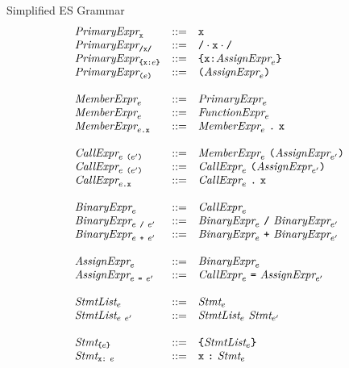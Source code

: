 \documentclass[onecolumn]{sigplanconf-onecolumn}
\begin{document}
\begin{displayfigure*}{\label{fig:grammar}Simplified ES Grammar}
\[
\begin{array}{lcl}
  \textit{PrimaryExpr}_{\texttt{x}} &::=& \texttt{x} 
  \\
  \textit{PrimaryExpr}_{\texttt{/x/}} &::=& \texttt{/} \cdot \texttt{x} \cdot \texttt{/} 
  \\
  \textit{PrimaryExpr}_{\texttt{\{}\texttt{x} \texttt{:} e\texttt{\}}} &::=& 
  \texttt{\{}\texttt{x} \texttt{:} \textit{AssignExpr}_{e}\texttt{\}}
  \\
  \textit{PrimaryExpr}_{\texttt{(}e\texttt{)}} &::=& 
  \texttt{(}\textit{AssignExpr}_{e}\texttt{)}
  \\ \\
  \textit{MemberExpr}_{e} &::=&
  \textit{PrimaryExpr}_{e}
  \\
  \textit{MemberExpr}_{e} &::=&
  \textit{FunctionExpr}_{e}
  \\
  \textit{MemberExpr}_{e\texttt{.\texttt{x}}} &::=&
  \textit{MemberExpr}_{e}~\texttt{.}~\texttt{x}
  \\ \\
  \textit{CallExpr}_{e~\texttt{(}e'\texttt{)}} &::=& 
  \textit{MemberExpr}_{e}~
  \texttt{(}\textit{AssignExpr}_{e'}\texttt{)}
  \\
  \textit{CallExpr}_{e~\texttt{(}e'\texttt{)}} &::=& 
  \textit{CallExpr}_{e}~
  \texttt{(}\textit{AssignExpr}_{e'}\texttt{)}
  \\
  \textit{CallExpr}_{e\texttt{.\texttt{x}}} &::=& 
  \textit{CallExpr}_{e}~\texttt{.}~
  \texttt{x}
  \\ \\
  \textit{BinaryExpr}_{e} &::=& \textit{CallExpr}_{e} \\
  \textit{BinaryExpr}_{e ~\texttt{/}~ e'}
  &::=&
  \textit{BinaryExpr}_{e} ~\texttt{/}~ \textit{BinaryExpr}_{e'} \\
  \textit{BinaryExpr}_{e ~\texttt{+}~ e'}
  &::=&
  \textit{BinaryExpr}_{e} ~\texttt{+}~ \textit{BinaryExpr}_{e'}
  \\ \\
  \textit{AssignExpr}_{e} &::=&
  \textit{BinaryExpr}_{e}
  \\
  \textit{AssignExpr}_{e~\texttt{=}~e'} &::=&
  \textit{CallExpr}_{e}~\texttt{=}~
  \textit{AssignExpr}_{e'}
  \\ \\
  \textit{StmtList}_{e} &::=&
  \textit{Stmt}_{e}
  \\
  \textit{StmtList}_{e~e'} &::=&
  \textit{StmtList}_{e}~
  \textit{Stmt}_{e'}
  \\ \\
  \textit{Stmt}_{\texttt{\{}e\texttt{\}}} &::=& 
  \texttt{\{} \textit{StmtList}_{e} \texttt{\}} 
  \\
  \textit{Stmt}_{\texttt{x}\texttt{:}~e} &::=&
  \texttt{x}~\texttt{:}~\textit{Stmt}_{e}

\end{array}\]
\end{displayfigure*}
\end{document}
